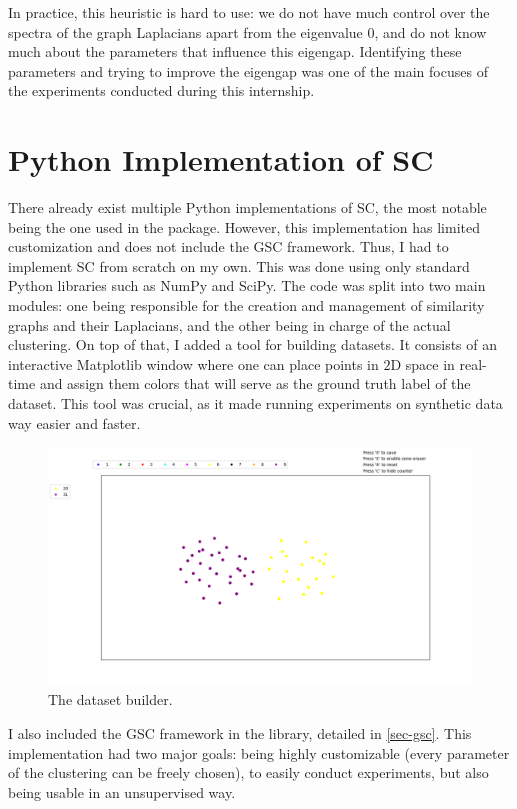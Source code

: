 \documentclass[a4paper,12pt]{article}
\theoremstyle{definition}
\theoremstyle{plain}
\begin{document}
In practice, this heuristic is hard to use: we do not have much control over the spectra of the graph Laplacians apart from the eigenvalue $0$, and do not know much about the parameters that influence this eigengap. Identifying these parameters and trying to improve the eigengap was one of the main focuses of the experiments conducted during this internship.

\newpage
\section{Python Implementation of SC}
There already exist multiple Python implementations of SC, the most notable being the one used in the \cite{scikit} package. However, this implementation has limited customization and does not include the GSC framework. Thus, I had to implement SC from scratch on my own. This was done using only standard Python libraries such as NumPy and SciPy. The code was split into two main modules: one being responsible for the creation and management of similarity graphs and their Laplacians, and the other being in charge of the actual clustering. On top of that, I added a tool for building datasets. It consists of an interactive Matplotlib window where one can place points in $2$D space in real-time and assign them colors that will serve as the ground truth label of the dataset. This tool was crucial, as it made running experiments on synthetic data way easier and faster.
\begin{figure}[H]
	\centering
	\includegraphics[width=0.9\linewidth]{figures/dataset_builder}
	\caption{The dataset builder.}
	\label{fig:dataset_builder}
\end{figure}

I also included the GSC framework in the library, detailed in \ref{sec-gsc}. This implementation had two major goals: being highly customizable (every parameter of the clustering can be freely chosen), to easily conduct experiments, but also being usable in an unsupervised way.
\end{document}
